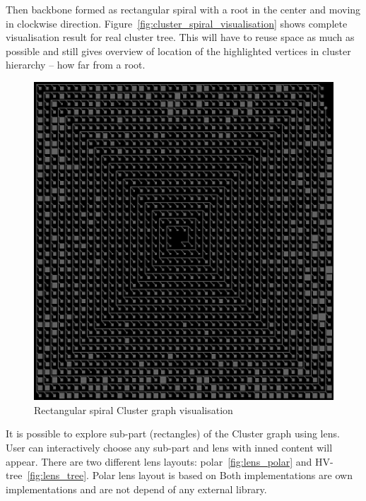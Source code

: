 Then backbone formed as rectangular spiral with a root in the center and moving in clockwise direction. Figure~\ref{fig:cluster_spiral_visualisation} shows complete visualisation result for real cluster tree. This will have to reuse space as much as possible and still gives overview of location of the highlighted vertices in cluster hierarchy -- how far from a root.

\begin{figure}[h!]
\centering
\includegraphics[scale=0.4]{pictures/cluster_spiral_visualisation.png}
\caption{Rectangular spiral Cluster graph visualisation}
\label{fig:cluster_visualisation}
\end{figure}

It is possible to explore sub-part (rectangles) of the Cluster graph using lens. User can interactively choose any sub-part and lens with inned content will appear. There are two different lens layouts: polar~\ref{fig:lens_polar} and HV-tree~\ref{fig:lens_tree}. Polar lens layout is based on Both implementations are own implementations and are not depend of any external library.

